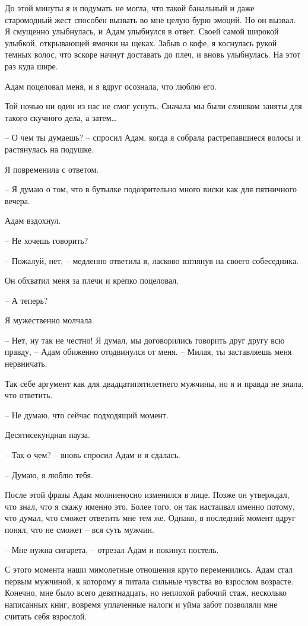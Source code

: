 \documentclass[
]{book}
\begin{document}
До этой минуты я и подумать не могла, что такой банальный и даже старомодный жест способен вызвать во мне целую бурю эмоций. Но он вызвал. Я смущенно улыбнулась, и Адам улыбнулся в ответ. Своей самой широкой улыбкой, открывающей ямочки на щеках. Забыв о кофе, я коснулась рукой темных волос, что вскоре начнут доставать до плеч, и вновь улыбнулась. На этот раз куда шире.

Адам поцеловал меня, и я вдруг осознала, что люблю его.

Той ночью ни один из нас не смог уснуть. Сначала мы были слишком заняты для такого скучного дела, а затем\ldots{}

-- О чем ты думаешь? -- спросил Адам, когда я собрала растрепавшиеся волосы и растянулась на подушке.

Я повременила с ответом.

-- Я думаю о том, что в бутылке подозрительно много виски как для пятничного вечера.

Адам вздохнул.

-- Не хочешь говорить?

-- Пожалуй, нет, -- медленно ответила я, ласково взглянув на своего собеседника.

Он обхватил меня за плечи и крепко поцеловал.

-- А теперь?

Я мужественно молчала.

-- Нет, ну так не честно! Я думал, мы договорились говорить друг другу всю правду, -- Адам обиженно отодвинулся от меня. -- Милая, ты заставляешь меня нервничать.

Так себе аргумент как для двадцатипятилетнего мужчины, но я и правда не знала, что ответить.

-- Не думаю, что сейчас подходящий момент.

Десятисекундная пауза.

-- Так о чем? -- вновь спросил Адам и я сдалась.

-- Думаю, я люблю тебя.

После этой фразы Адам молниеносно изменился в лице. Позже он утверждал, что знал, что я скажу именно это. Более того, он так настаивал именно потому, что думал, что сможет ответить мне тем же. Однако, в последний момент вдруг понял, что не сможет -- вся суть мужчин.

-- Мне нужна сигарета, -- отрезал Адам и покинул постель.

С этого момента наши мимолетные отношения круто переменились. Адам стал первым мужчиной, к которому я питала сильные чувства во взрослом возрасте. Конечно, мне было всего девятнадцать, но неплохой рабочий стаж, несколько написанных книг, вовремя уплаченные налоги и уйма забот позволяли мне считать себя взрослой.
\end{document}
